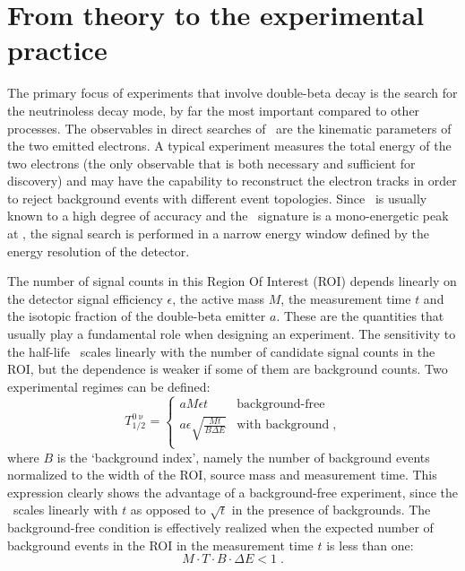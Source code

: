 \begin{table}
  \centering
  \caption{%
    Compilation of current experimental bounds at 90\% C.L.~on the Lorentz-violating \aof\
    coefficient from double-beta decay.
  }\label{tab:nbb:2nbblv-lim}
  
\end{table}

\section{From theory to the experimental practice}%
\label{sec:nbb:exp}

The primary focus of experiments that involve double-beta decay is the search for the
neutrinoless decay mode, by far the most important compared to other processes. The
observables in direct searches of \onbb\ are the kinematic parameters of the two emitted
electrons. A typical experiment measures the total energy of the two electrons (the only
observable that is both necessary and sufficient for discovery) and may have the
capability to reconstruct the electron tracks in order to reject background events with
different event topologies. Since \qbb\ is usually known to a high degree of accuracy and
the \onbb\ signature is a mono-energetic peak at \qbb, the signal search is performed in a
narrow energy window defined by the energy resolution of the detector.

The number of signal counts in this Region Of Interest (ROI) depends linearly on the
detector signal efficiency $\epsilon$, the active mass $M$, the measurement time $t$ and
the isotopic fraction of the double-beta emitter $a$.  These are the quantities that
usually play a fundamental role when designing an experiment. The sensitivity to the
half-life \thalfzero\ scales linearly with the number of candidate signal counts in the
ROI, but the dependence is weaker if some of them are background counts. Two experimental
regimes can be defined:
\begin{equation}\label{eq:nbb:bkglevel}
  T^{0\upnu}_{1/2} =
    \begin{cases}
      a M \epsilon t & \text{background-free} \\
      a \epsilon \sqrt{\frac{M t}{B \Delta{E}}} & \text{with background} \;, \\
    \end{cases}
\end{equation}
where $B$ is the `background index', namely the number of background events normalized to
the width of the ROI, source mass and measurement time. This expression clearly shows the
advantage of a background-free experiment, since the \thalfzero\ scales linearly with $t$
as opposed to $\sqrt{t}$ in the presence of backgrounds. The background-free condition is
effectively realized when the expected number of background events in the ROI in the
measurement time $t$ is less than one:
\[
  M \cdot T \cdot B \cdot \Delta{E} < 1 \;.
\]

